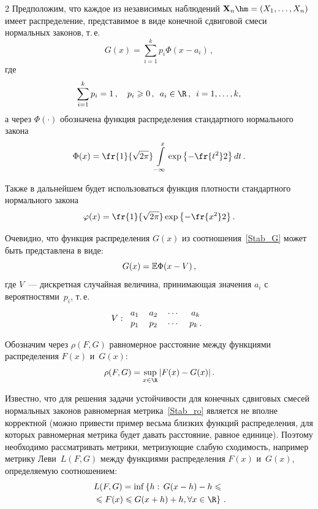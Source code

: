 \begin{multicols}{2}
Предположим, что каждое из независимых наблюдений
$\mathbf{X}_n\hm=(X_1,\ldots,X_n)$ имеет распределение,
представимое в виде конечной сдвиговой смеси нормальных законов,
т.\,е.\
\begin{equation}
\label{Stab_G} 
G(x)=\sum\limits_{i=1}^k p_i\Phi(x-a_i)\,,
\end{equation}
где
\begin{equation*}
\sum\limits_{i=1}^{k}p_i=1\,,\quad p_i\geqslant0\,,\enskip a_i\in\R\,,\enskip  i=1,\ldots,k,
\end{equation*}
а через $\Phi(\cdot)$ обозначена функция распределения
стандартного нормального закона
\begin{equation*}
\Phi(x)=\fr{1}{\sqrt{2\pi}}\int\limits_{-\infty}^x\exp{\left\{
-\fr{t^2}2\right\}}\,dt\,.
\end{equation*}

Также в дальнейшем будет использоваться функция плотности
стандартного нормального закона
$$
\varphi(x)=\fr{1}{\sqrt{2\pi}}\exp{\left\{ -\fr{x^2}2\right\}}\,.
$$

Очевидно, что функция распределения $G(x)$ из
соотношения~\eqref{Stab_G} может быть представлена в виде:
$$
G(x)=\mathbb E\Phi(x-V)\,,
$$
где $V$~--- дискретная случайная величина, принимающая значения
$a_i$ с вероятностями~$p_i$, т.\,е.\
\begin{equation}
\label{Stab_V} V:
\begin{tabular}{cccc}
$a_1$&$a_2$&$\cdots$&$a_k$\\
$p_1$&$p_2$&$\cdots$&$p_k$\,.
\end{tabular}
\end{equation}

Обозначим  через $\rho(F,G)$ равномерное расстояние между
функциями распределения $F(x)$ и~$G(x)$:
\begin{equation}
\label{Stab_ro}
\rho(F,G)=\sup\limits_{x\in\R}|F(x)-G(x)|\,.
\end{equation}

Известно, что для решения задачи устойчивости для конечных
сдвиговых смесей нормальных законов равномерная
метрика~\eqref{Stab_ro} является не вполне корректной (можно привести
пример весьма близких функций распределения, для которых
равномерная метрика будет давать расстояние, равное единице). Поэтому
необходимо рассматривать мет\-ри\-ки, метризующие слабую сходимость,
например метрику Леви~$L(F,G)$ между функциями распределения
$F(x)$ и~$G(x)$, определяемую соотношением:
\begin{multline*}
L(F,G)=\inf\left\{h:\, G(x-h)-h\leqslant{}\right.\\
\left.{}\leqslant F(x)\leqslant G(x+h)+h,
\forall x\in\R\right\}\,.
\end{multline*}


\end{multicols}
